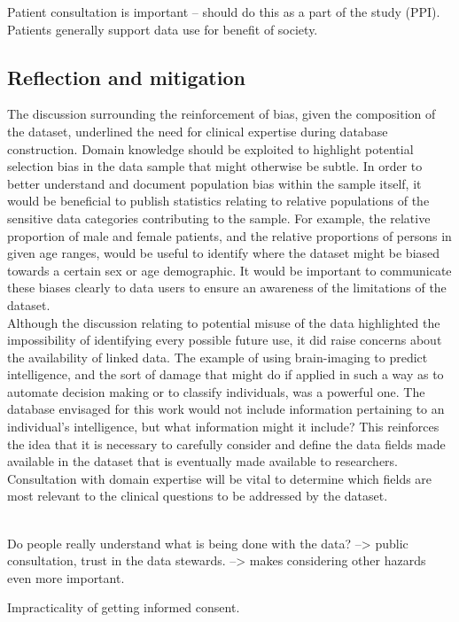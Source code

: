 \documentclass{article}
\begin{document}
Patient consultation is important -- should do this as a part of
  the study (PPI).  
 Patients generally support data use for benefit of society.

\subsection{Reflection and mitigation}
 
The discussion surrounding the reinforcement of bias, given the
composition of the dataset, underlined the need for clinical expertise
during database construction. Domain knowledge should be exploited to
highlight potential selection bias in the data sample that might
otherwise be subtle. In order to better understand and document
population bias within the sample itself, it would be beneficial to
publish statistics relating to relative populations of the sensitive data
categories contributing to the sample. For example, the relative
proportion of male and female patients, and the relative proportions
of persons in given age ranges, would be useful to identify where the dataset might be biased towards a certain
sex or age demographic.
It would be important to communicate these biases clearly to data
users to ensure an awareness of the limitations of the dataset.\\
 
Although the discussion relating to potential misuse of the data
highlighted the impossibility of identifying every possible future
use, it did raise concerns about the availability of linked data.
The example of using brain-imaging to predict intelligence, and the
sort of damage that might do if applied in such a way as to automate
decision making or to classify individuals, was a powerful one. The
database envisaged for this work would not include information
pertaining to an individual's intelligence, but what information might
it include? This reinforces the idea that it is necessary to carefully
consider and define the data fields made available in the dataset that
is eventually made available to researchers. Consultation with
domain expertise will be vital to determine which fields are most
relevant to the clinical questions to be addressed by the dataset.\\


 
~\cite{xafis}

 Do people really understand what is being done with the
  data?
  --> public consultation, trust in the data stewards.
  --> makes considering other hazards even more important.

 Impracticality of getting informed consent.


\printbibliography
\end{document}
